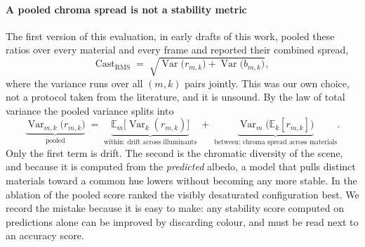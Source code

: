 \paragraph{A pooled chroma spread is not a stability metric}
\label{par:castrms_correction}
The first version of this evaluation, in early drafts of this work, pooled these ratios
over every material and every frame and reported their combined spread,
\begin{equation}
  \text{Cast}_{\text{RMS}} \;=\;
  \sqrt{\operatorname{Var}\bigl(r_{m,k}\bigr) + \operatorname{Var}\bigl(b_{m,k}\bigr)} ,
  \label{eq:castrms}
\end{equation}
where the variance runs over all $(m,k)$ pairs jointly. This was our own choice, not a
protocol taken from the literature, and it is unsound. By the law of total variance the
pooled variance splits into
\begin{equation}
  \underbrace{\operatorname{Var}_{m,k}\bigl(r_{m,k}\bigr)}_{\text{pooled}}
  \;=\;
  \underbrace{\mathbb{E}_{m}\bigl[\operatorname{Var}_{k}(r_{m,k})\bigr]}_{\text{within: drift across illuminants}}
  \;+\;
  \underbrace{\operatorname{Var}_{m}\bigl(\mathbb{E}_{k}[r_{m,k}]\bigr)}_{\text{between: chroma spread across materials}} .
  \label{eq:castdecomp}
\end{equation}
Only the first term is drift. The second is the chromatic diversity of the scene, and
because it is computed from the \emph{predicted} albedo, a model that pulls distinct
materials toward a common hue lowers  without becoming any more
stable. In the ablation of  the pooled score ranked the visibly
desaturated configuration best. We record the mistake because it is easy to make: any
stability score computed on predictions alone can be improved by discarding colour, and
must be read next to an accuracy score.

